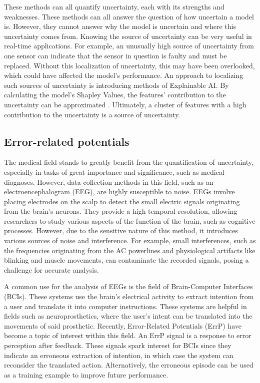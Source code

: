 These methods can all quantify uncertainty, each with its strengths and weaknesses. These methods can all answer the question of how uncertain a model is. However, they cannot answer why the model is uncertain and where this uncertainty comes from. Knowing the source of uncertainty can be very useful in real-time applications. For example, an unusually high source of uncertainty from one sensor can indicate that the sensor in question is faulty and must be replaced. Without this localization of uncertainty, this may have been overlooked, which could have affected the model's performance. An approach to localizing such sources of uncertainty is introducing methods of Explainable AI. By calculating the model's Shapley Values, the features' contribution to the uncertainty can be approximated \citep{merrick2020explanation}. Ultimately, a cluster of features with a high contribution to the uncertainty is a source of uncertainty. 

\subsection{Error-related potentials}

The medical field stands to greatly benefit from the quantification of uncertainty, especially in tasks of great importance and significance, such as medical diagnoses. However, data collection methods in this field, such as an electroencephalogram (EEG), are highly susceptible to noise. EEGs involve placing electrodes on the scalp to detect the small electric signals originating from the brain's neurons. They provide a high temporal resolution, allowing researchers to study various aspects of the function of the brain, such as cognitive processes. However, due to the sensitive nature of this method, it introduces various sources of noise and interference. For example, small interferences, such as the frequencies originating from the AC powerlines and physiological artifacts like blinking and muscle movements, can contaminate the recorded signals, posing a challenge for accurate analysis.

A common use for the analysis of EEGs is the field of Brain-Computer Interfaces (BCIs). These systems use the brain's electrical activity to extract intention from a user and translate it into computer instructions. These systems are helpful in fields such as neuroprosthetics, where the user's intent can be translated into the movements of said prosthetic. Recently, Error-Related Potentials (ErrP) have become a topic of interest within this field. An ErrP signal is a response to error perception after feedback. These signals spark interest for BCIs since they indicate an erroneous extraction of intention, in which case the system can reconsider the translated action. Alternatively, the erroneous episode can be used as a training example to improve future performance. 

